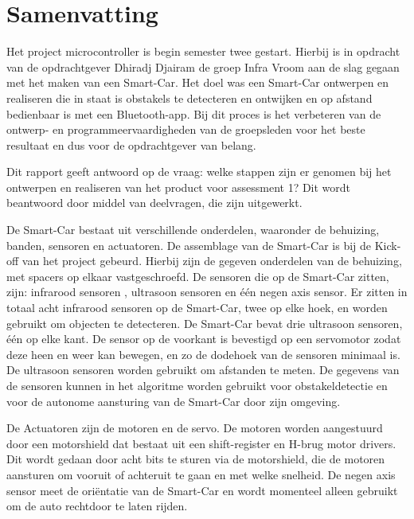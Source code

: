 \section*{Samenvatting}
Het project microcontroller is begin semester twee gestart. Hierbij is in opdracht van de opdrachtgever Dhiradj Djairam de groep Infra Vroom aan de slag gegaan met het maken van een \gls{Smart-Car}. Het doel was een \gls{Smart-Car} ontwerpen en realiseren die in staat is obstakels te detecteren en ontwijken en op afstand bedienbaar is met een \gls{Bluetooth}-app. Bij dit proces is het verbeteren van de ontwerp- en programmeervaardigheden van de groepsleden voor het beste resultaat en dus voor de opdrachtgever van belang.

Dit rapport geeft antwoord op de vraag: welke stappen zijn er genomen bij het ontwerpen en realiseren van het product voor assessment 1? Dit wordt beantwoord door middel van deelvragen, die zijn uitgewerkt.

 De \gls{Smart-Car} bestaat uit verschillende onderdelen, waaronder de behuizing, banden, sensoren en actuatoren. De assemblage van de \gls{Smart-Car} is bij de Kick-off van het project gebeurd. Hierbij zijn de gegeven onderdelen van de behuizing, met spacers op elkaar vastgeschroefd. De sensoren die op de \gls{Smart-Car} zitten, zijn: infrarood\cite{IR-datasheet} sensoren , ultrasoon sensoren en één negen axis sensor. Er zitten in totaal acht infrarood sensoren op de \gls{Smart-Car}, twee op elke hoek, en worden gebruikt om objecten te detecteren. De \gls{Smart-Car} bevat drie ultrasoon sensoren, één op elke kant. De sensor op de voorkant is bevestigd op een servomotor zodat deze heen en weer kan bewegen, en zo de dodehoek van de sensoren minimaal is. De ultrasoon sensoren worden gebruikt om afstanden te meten. De gegevens van de sensoren kunnen in het algoritme worden gebruikt voor obstakeldetectie en voor de autonome aansturing van de \gls{Smart-Car} door zijn omgeving. 
 
 De Actuatoren zijn de motoren en de servo. De motoren worden aangestuurd door een \gls{motorshield} dat bestaat uit een \gls{shift-register} en \gls{H-brug} motor drivers\cite{h-brug}. Dit wordt gedaan door acht bits te sturen via de motorshield, die de motoren aansturen om vooruit of achteruit te gaan en met welke snelheid. De negen axis sensor meet de oriëntatie van de \gls{Smart-Car} en wordt momenteel alleen gebruikt om de auto rechtdoor te laten rijden. 

